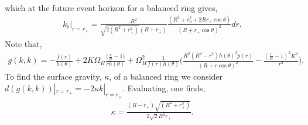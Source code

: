 \documentclass[11pt]{article}
\begin{document}
which at the future event horizon for a balanced ring gives, 
\begin{eqnarray}
k_{\flat}|_{r=r_+}=\frac{R^2}{\sqrt{2(R^2+r_+^2)}(R+r_+)}\frac{(R^2+r^2_0+2Rr_+\cos\theta)}{(R+r_+\cos\theta)^2}dr.
\end{eqnarray}
Note that,
\begin{eqnarray}
g(k,k)=-\frac{f(r)}{h(\theta)}+2K\Omega_H\frac{\big(\frac{r}{R}-1\big)}{rh(\theta)}+\Omega_H^2\frac{1}{f(r)h(\theta)}\Big(\frac{R^2(R^2-r^2)h(\theta)^2p(r)}{(R+r\cos\theta)^2}-\frac{(\frac{r}{R}-1)^2K^2}{r^2}\Big).
\end{eqnarray}
To find the surface gravity, $\kappa$, of a balanced ring we consider $d(g(k,k))|_{r=r_+}=-2\kappa k|_{r=r_+}$. Evaluating, one finds, 
\begin{eqnarray}
\kappa=\frac{(R-r_+)\sqrt{(R^2+r_+^2)}}{2\sqrt{2}R^2r_+}.
\end{eqnarray}
\end{document}
